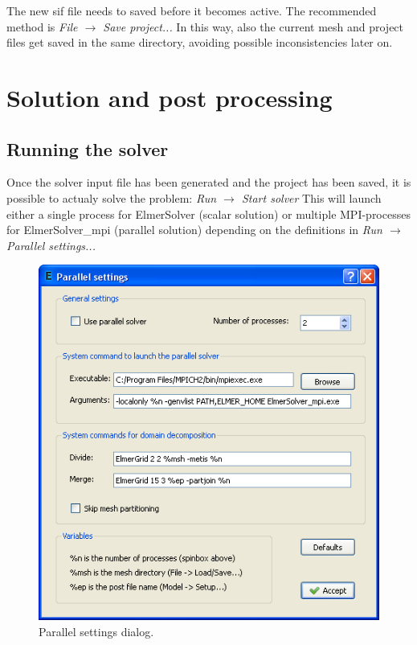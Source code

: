\documentclass[a4paper,12pt]{article}
\newcommand{\menu}[2]{{\it \vskip2mm #1 $\rightarrow$ #2 \vskip2mm}}
\begin{document}
The new sif file needs to saved before it becomes active. The recommended
method is
\menu{File}{Save project...}
\noindent In this way, also the current mesh and project files get saved in the
same directory, avoiding possible inconsistencies later on.

\section{Solution and post processing}

\subsection{Running the solver}

Once the solver input file has been generated and the project has been saved,
it is possible to actualy solve the problem:
\menu{Run}{Start solver}
\noindent This will launch either a single process for ElmerSolver (scalar solution)
or multiple MPI-processes for ElmerSolver\_mpi (parallel solution) depending on the
definitions in
\menu{Run}{Parallel settings...}

\begin{figure}[ht]
\begin{center}
 \includegraphics[scale=0.5]{images/parallelsettings.png}
\caption{Parallel settings dialog.}
\end{center}
\end{figure}
\end{document}

